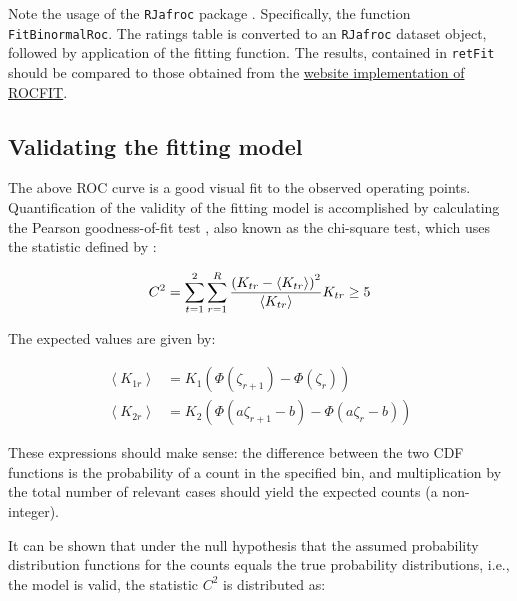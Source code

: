 \documentclass[
]{book}
\begin{document}
Note the usage of the \texttt{RJafroc} package \citep{R-RJafroc}. Specifically, the function \texttt{FitBinormalRoc}. The ratings table is converted to an \texttt{RJafroc} dataset object, followed by application of the fitting function. The results, contained in \texttt{retFit} should be compared to those obtained from the \href{http://www.rad.jhmi.edu/jeng/javarad/roc/JROCFITi.html}{website implementation of ROCFIT}.

\hypertarget{validating-the-fitting-model}{%
\subsection{Validating the fitting model}\label{validating-the-fitting-model}}

The above ROC curve is a good visual fit to the observed operating points. Quantification of the validity of the fitting model is accomplished by calculating the Pearson goodness-of-fit test \citep{RN2656}, also known as the chi-square test, which uses the statistic defined by \citep{RN1492}:

\begin{equation} 
C^2=\sum_{t=1}^{2}\sum_{r=1}^{R}\frac{\left (K_{tr}-\left \langle K_{tr} \right \rangle  \right )^2}{\left \langle K_{tr} \right \rangle}\\
K_{tr} \geq 5
\label{eq:BinModGoodnessFit}
\end{equation}

The expected values are given by:

\begin{equation}
\begin{split}
\left \langle K_{1r} \right \rangle &=K_1\left ( \Phi\left ( \zeta_{r+1} \right ) - \Phi\left ( \zeta_r \right )  \right ) \\
\left \langle K_{2r} \right \rangle &=K_2\left ( \Phi\left ( a\zeta_{r+1}-b \right ) - \Phi\left ( a\zeta_r - b\right )  \right )
\end{split}
\label{eq:BinModGoodnessFitExpVals}
\end{equation}

These expressions should make sense: the difference between the two CDF functions is the probability of a count in the specified bin, and multiplication by the total number of relevant cases should yield the expected counts (a non-integer).

It can be shown that under the null hypothesis that the assumed probability distribution functions for the counts equals the true probability distributions, i.e., the model is valid, the statistic \(C^2\) is distributed as:
\end{document}
